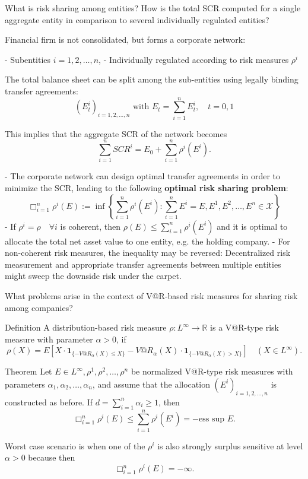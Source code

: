 What is risk sharing among entities? How is the total SCR computed for a single
aggregate entity in comparison to several individually regulated entities?

Financial firm is not consolidated, but forms a corporate network:

- Subentities \(i=1,2, \dots, n\),
- Individually regulated according to risk measures \(\rho^i\)

The total balance sheet can be split among the sub-entities using legally binding transfer agreements:
\[(E_t^i)_{i=1,2, \dots, n} \text{ with } E_t = \sum_{i=1}^n E_t^i, \quad t=0,1\]

This implies that the aggregate SCR of the network becomes
\[\sum_{i=1}^n SCR^i = E_0 + \sum_{i=1}^n \rho^i(E^i).\]

- The corporate network can design optimal transfer agreements in order to minimize the SCR, 
  leading to the following \textbf{optimal risk sharing problem}:
\[\Box_{i=1}^n \rho^i (E) := \inf \left\{ \sum_{i=1}^n \rho^i(E^i) : \sum_{i=1}^n E^i = E, E^1, E^2, \dots, E^n \in \mathcal{X} \right\}\]
- If \(\rho^i = \rho \quad \forall i\) is coherent, then \(\rho(E) \leq \sum_{i=1}^n \rho^i(E^i)\) and it is optimal to allocate the 
  total net asset value to one entity, e.g. the holding company.
- For non-coherent risk measures, the inequality may be reversed: 
  Decentralized risk measurement and appropriate transfer agreements between multiple entities might sweep the downside risk under the carpet.

What problems arise in the context of V@R-based risk
measures for sharing risk among companies?

Definition
A distribution-based risk measure \(\rho: L^{\infty} \rightarrow \mathbb{R}\) is a V@R-type risk measure with parameter \(\alpha > 0\), if
\[\rho(X) = E \left[ X \cdot \mathbf{1}_{\{-V@R_{\alpha}(X) \leq X\}} - V@R_{\alpha}(X) \cdot \mathbf{1}_{\{-V@R_{\alpha}(X) > X\}} \right] \quad (X \in L^{\infty}).\]

Theorem
Let \(E \in L^{\infty}, \rho^1, \rho^2, \dots, \rho^n\) be normalized V@R-type risk measures with parameters \(\alpha_1, \alpha_2, \dots, \alpha_n\), and assume that the allocation \((E^i)_{i=1,2,\dots,n}\) is constructed as before. If \(d = \sum_{i=1}^n \alpha_i \geq 1\), then
\[\Box_{i=1}^n \rho^i(E) \leq \sum_{i=1}^n \rho^i(E^i) = -\text{ess sup } E.\]

Worst case scenario is when one of the \( \rho^i \) is also strongly surplus sensitive at level \( α > 0 \)
because then 
\[\Box_{i=1}^n \rho^i(E) = - \infty.\]



